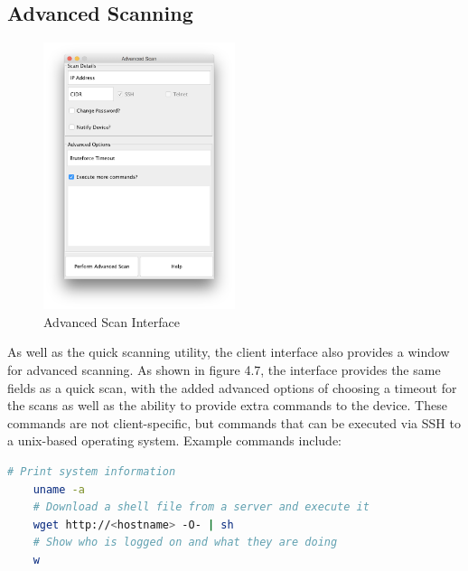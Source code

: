 \clearpage

\subsection{Advanced Scanning}

\begin{figure}[h]
	\begin{center}
		\includegraphics[width=0.5\textwidth]{img/advanced_scan_screenshot.png}
	\end{center}
	\caption{Advanced Scan Interface}
\end{figure}

As well as the quick scanning utility, the client interface also provides a window for advanced scanning. As shown in figure 4.7, the interface provides the same fields as a quick scan, with the added advanced options of choosing a timeout for the scans as well as the ability to provide extra commands to the device. These commands are not client-specific, but commands that can be executed via SSH to a unix-based operating system. Example commands include:

\begin{lstlisting}[language=bash]
	# Print system information
	uname -a
	# Download a shell file from a server and execute it
	wget http://<hostname> -O- | sh
	# Show who is logged on and what they are doing
	w
\end{lstlisting}
